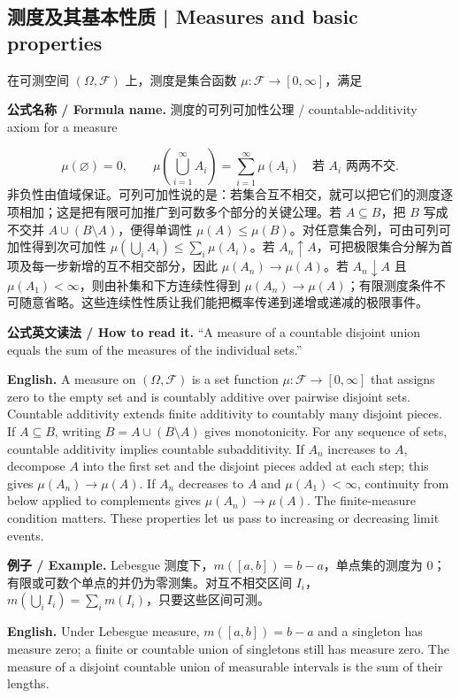 \documentclass[UTF8,11pt,a4paper]{ctexart}
\newcommand{\EN}[1]{\par\noindent\textbf{English.} #1\par}
\newcommand{\READ}[1]{\par\noindent\textbf{公式英文读法 / How to read it.} #1\par}
\newcommand{\FORMULA}[2]{\par\noindent\textbf{公式名称 / Formula name.} #1 / #2\par}
\newcommand{\EX}[2]{\par\noindent\textbf{例子 / Example.} #1\par\EN{#2}}
\begin{document}
\subsection{测度及其基本性质 | Measures and basic properties}
\noindent 在可测空间 $(\Omega,\mathcal F)$ 上，测度是集合函数 $\mu:\mathcal F\to[0,\infty]$，满足
\FORMULA{测度的可列可加性公理}{countable-additivity axiom for a measure}
\[
\mu(\varnothing)=0,\qquad
\mu\left(\bigcup_{i=1}^{\infty}A_i\right)=\sum_{i=1}^{\infty}\mu(A_i)
\quad\text{若 }A_i\text{ 两两不交}.
\]
非负性由值域保证。可列可加性说的是：若集合互不相交，就可以把它们的测度逐项相加；这是把有限可加推广到可数多个部分的关键公理。若 $A\subseteq B$，把 $B$ 写成不交并 $A\cup(B\setminus A)$，便得单调性 $\mu(A)\le\mu(B)$。对任意集合列，可由可列可加性得到次可加性 $\mu(\bigcup_iA_i)\le\sum_i\mu(A_i)$。若 $A_n\uparrow A$，可把极限集合分解为首项及每一步新增的互不相交部分，因此 $\mu(A_n)\to\mu(A)$。若 $A_n\downarrow A$ 且 $\mu(A_1)<\infty$，则由补集和下方连续性得到 $\mu(A_n)\to\mu(A)$；有限测度条件不可随意省略。这些连续性性质让我们能把概率传递到递增或递减的极限事件。
\READ{“A measure of a countable disjoint union equals the sum of the measures of the individual sets.”}
\EN{A measure on $(\Omega,\mathcal F)$ is a set function $\mu:\mathcal F\to[0,\infty]$ that assigns zero to the empty set and is countably additive over pairwise disjoint sets. Countable additivity extends finite additivity to countably many disjoint pieces. If $A\subseteq B$, writing $B=A\cup(B\setminus A)$ gives monotonicity. For any sequence of sets, countable additivity implies countable subadditivity. If $A_n$ increases to $A$, decompose $A$ into the first set and the disjoint pieces added at each step; this gives $\mu(A_n)\to\mu(A)$. If $A_n$ decreases to $A$ and $\mu(A_1)<\infty$, continuity from below applied to complements gives $\mu(A_n)\to\mu(A)$. The finite-measure condition matters. These properties let us pass to increasing or decreasing limit events.}

\EX{Lebesgue 测度下，$m([a,b])=b-a$，单点集的测度为 $0$；有限或可数个单点的并仍为零测集。对互不相交区间 $I_i$，$m(\bigcup_i I_i)=\sum_i m(I_i)$，只要这些区间可测。}{Under Lebesgue measure, $m([a,b])=b-a$ and a singleton has measure zero; a finite or countable union of singletons still has measure zero. The measure of a disjoint countable union of measurable intervals is the sum of their lengths.}
\end{document}
